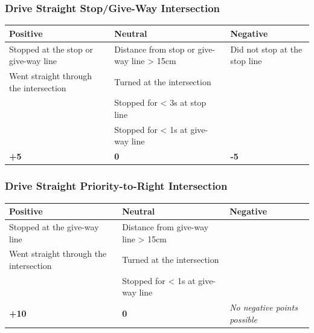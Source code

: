 \subsubsection*{Drive Straight Stop/Give-Way Intersection}
\begin{table}[H]
	\begin{tabularx}{\textwidth}{XXX}
		\toprule
		\textbf{Positive}                                     & \textbf{Neutral}                                            & \textbf{Negative}                              \\
		\midrule
		Stopped at the stop or give-way line \footnotemark[2] & Distance from stop or give-way line > 15cm \footnotemark[2] & Did not stop at the stop line \footnotemark[3] \\
		Went straight through the intersection                & Turned at the intersection                                  &                                                \\
		                                                      & Stopped for < 3s at stop line \footnotemark[2]              &                                                \\
		                                                      & Stopped for < 1s at give-way line \footnotemark[2]          &                                                \\
		\topstrut
		\textbf{+5}                                           & \textbf{0}                                                  & \textbf{-5}                                    \\
		\bottomrule
	\end{tabularx}
\end{table}

\subsubsection*{Drive Straight Priority-to-Right Intersection}
\begin{table}[H]
	\begin{tabularx}{\textwidth}{XXX}
		\toprule
		\textbf{Positive}                             & \textbf{Neutral}                                    & \textbf{Negative}                    \\
		\midrule
		Stopped at the give-way line \footnotemark[2] & Distance from give-way line > 15cm \footnotemark[2] &                                      \\
		Went straight through the intersection        & Turned at the intersection                          &                                      \\
		                                              & Stopped for < 1s at give-way line \footnotemark[2]  &                                      \\
		\topstrut
		\textbf{+10}                                  & \textbf{0}                                          & \textit{No negative points possible} \\
		\bottomrule
	\end{tabularx}
\end{table}

